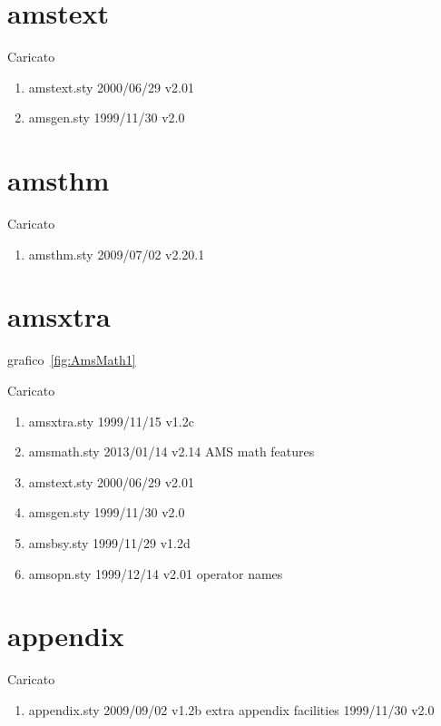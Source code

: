 \section{amstext}

Caricato 
\begin{enumerate}
\item amstext.sty 2000/06/29 v2.01
\item amsgen.sty 1999/11/30 v2.0
\end{enumerate}
\section{amsthm}

Caricato 
\begin{enumerate}
\item amsthm.sty 2009/07/02 v2.20.1
\end{enumerate}
\section{amsxtra}

grafico~\vref{fig:AmsMath1}

Caricato 
\begin{enumerate}
 \item amsxtra.sty 1999/11/15 v1.2c
 \item amsmath.sty 2013/01/14 v2.14 AMS math features
 \item amstext.sty 2000/06/29 v2.01
 \item amsgen.sty 1999/11/30 v2.0
 \item amsbsy.sty 1999/11/29 v1.2d
 \item amsopn.sty 1999/12/14 v2.01 operator names
\end{enumerate}
\section{appendix}

Caricato 
\begin{enumerate}
\item appendix.sty 2009/09/02 v1.2b extra appendix facilities 1999/11/30 v2.0
\end{enumerate}

